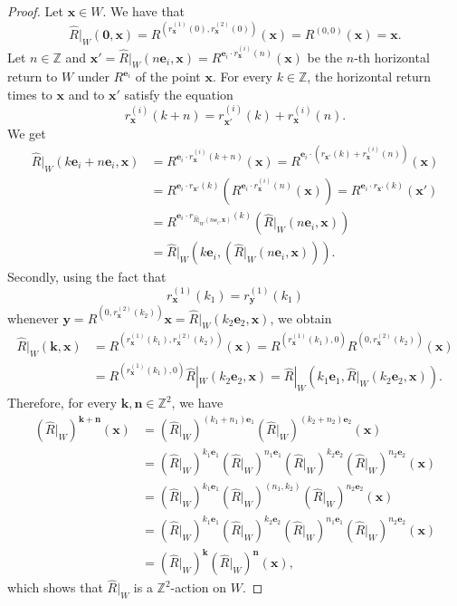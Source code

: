 \documentclass[12pt]{amsart}
\newcommand{\Z}{\mathbb{Z}}
\newcommand{\zero}{{\boldsymbol{0}}}
\newcommand{\be}{{\boldsymbol{e}}}
\newcommand{\bk}{{\boldsymbol{k}}}
\newcommand{\bn}{{\boldsymbol{n}}}
\newcommand{\bx}{{\boldsymbol{x}}}
\newcommand{\by}{{\boldsymbol{y}}}
\begin{document}
\begin{proof}
    Let $\bx\in W$.
    We have that
    \[
    \widehat{R}|_W(\zero,\bx)
    = R^{(r_\bx^{(1)}(0),r_\bx^{(2)}(0))}(\bx)
    = R^{(0,0)}(\bx)
    = \bx.
    \]
    Let $n\in\Z$ and
    $\bx'=\widehat{R}|_W(n\be_i,\bx)=R^{\be_i\cdot r_\bx^{(i)}(n)}(\bx)$
    be the $n$-th horizontal return to $W$ under $R^{\be_i}$ of the point $\bx$.
    For every $k\in\Z$, the horizontal return times to $\bx$ and to $\bx'$ satisfy
    the equation
    \[
        r_\bx^{(i)}(k+n) = r^{(i)}_{\bx'}(k)+r_\bx^{(i)}(n).
    \]
    We get
    \begin{align*}
    \widehat{R}|_W(k\be_i+n\be_i,\bx)
        &= R^{\be_i\cdot r_\bx^{(i)}(k+n)}(\bx)
         = R^{\be_i\cdot(r_{\bx'}(k)+r_\bx^{(i)}(n))}(\bx)\\
        &= R^{\be_i\cdot r_{\bx'}(k)}
           \left(R^{\be_i\cdot r_\bx^{(i)}(n)}(\bx)\right)
         = R^{\be_i\cdot r_{\bx'}(k)} \left(\bx'\right)\\
        &= R^{\be_i\cdot r_{\widehat{R}|_W(n\be_i,\bx)}(k)}
           \left(\widehat{R}|_W(n\be_i,\bx)\right)\\
        &= \widehat{R}|_W\left(k\be_i, \left(\widehat{R}|_W(n\be_i,\bx)\right)\right).
    \end{align*}
    Secondly, using the fact that
    \[
        r_\bx^{(1)}(k_1) = r_\by^{(1)}(k_1)
    \]
    whenever $\by=R^{(0,r_\bx^{(2)}(k_2))}\bx=\widehat{R}|_W(k_2\be_2,\bx)$, we
    obtain
    \begin{align*}
    \widehat{R}|_W(\bk,\bx)
    &= R^{(r_\bx^{(1)}(k_1),r_\bx^{(2)}(k_2))}(\bx)
    = R^{(r_\bx^{(1)}(k_1),0)} R^{(0,r_\bx^{(2)}(k_2))}(\bx)\\
    &= R^{(r_\bx^{(1)}(k_1),0)} \widehat{R}|_W(k_2\be_2,\bx)
    = \widehat{R}|_W\left(k_1\be_1,
      \widehat{R}|_W(k_2\be_2,\bx)\right).
    \end{align*}
    Therefore, for every $\bk,\bn\in\Z^2$, we have
    \begin{align*}
        (\widehat{R}|_W)^{\bk+\bn}(\bx)
    &= (\widehat{R}|_W)^{(k_1+n_1)\be_1}
        (\widehat{R}|_W)^{(k_2+n_2)\be_2}(\bx)\\
     &= (\widehat{R}|_W)^{k_1\be_1} (\widehat{R}|_W)^{n_1\be_1}
        (\widehat{R}|_W)^{k_2\be_2} (\widehat{R}|_W)^{n_2\be_2}(\bx)\\
     &= (\widehat{R}|_W)^{k_1\be_1}
        (\widehat{R}|_W)^{(n_1,k_2)} (\widehat{R}|_W)^{n_2\be_2}(\bx)\\
     &= (\widehat{R}|_W)^{k_1\be_1} (\widehat{R}|_W)^{k_2\be_2}
        (\widehat{R}|_W)^{n_1\be_1} (\widehat{R}|_W)^{n_2\be_2}(\bx)\\
     &= (\widehat{R}|_W)^\bk (\widehat{R}|_W)^\bn(\bx),
    \end{align*}
    which shows that $\widehat{R}|_W$ is a $\Z^2$-action on $W$.
\end{proof}
\end{document}
